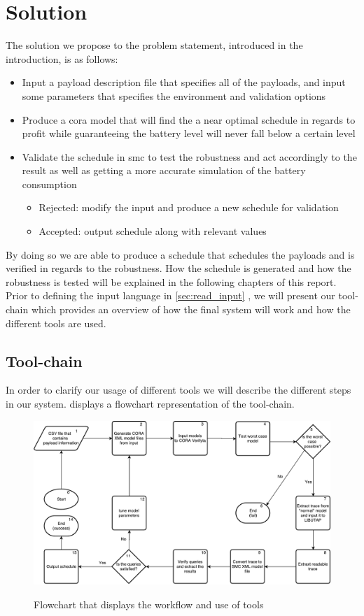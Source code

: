 \section{Solution} \label{sec:solution}
The solution we propose to the problem statement, introduced in the introduction, is as follows:
\begin{itemize}
	\item	Input a payload description file that specifies all of the payloads, and input some parameters that specifies the environment and validation options
	\item	Produce a \gls{cora} model that will find the a near optimal schedule in regards to profit while guaranteeing the battery level will never fall below a certain level
	\item	Validate the schedule in \gls{smc} to test the robustness and act accordingly to the result as well as getting a more accurate simulation of the battery consumption
	\begin{itemize}
		\item	Rejected: modify the input and produce a new schedule for validation
		\item	Accepted: output schedule along with relevant values
	\end{itemize}
\end{itemize}

By doing so we are able to produce a schedule that schedules the payloads and is verified in regards to the robustness.
How the schedule is generated and how the robustness is tested will be explained in the following chapters of this report.
Prior to defining the input language in \cref{sec:read_input} , we will present our tool-chain which provides an overview of how the final system will work and how the different tools are used.

\subsection{Tool-chain} \label{subsec:tool_chainv}
In order to clarify our usage of different tools we will describe the different steps in our system. 
 displays a flowchart representation of the tool-chain.

\begin{figure}[h]
	\includegraphics[width=\textwidth]{graphics/tool_chain.pdf}
	\label{fig:tool1}
	\caption{Flowchart that displays the workflow and use of tools}
\end{figure}

